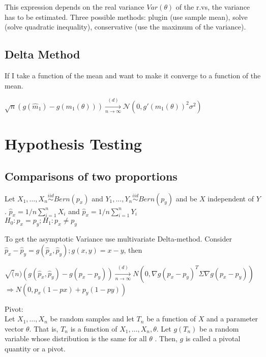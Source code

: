 This expression depends on the real variance $Var(\theta)$ of the r.vs, the variance has to be estimated. Three possible methods: plugin (use sample mean), solve (solve quadratic inequality), conservative (use the maximum of the variance).\\

\subsection*{Delta Method}

If I take a function of the mean and want to make it converge to a function of the mean. 

$\sqrt{n}(g(\widehat{m}_1) - g(m_1(\theta ))) \xrightarrow [n \to \infty ]{(d)} \mathcal{N}(0, g'(m_1(\theta ))^2 \sigma ^2)$


\section{Hypothesis Testing}
\subsection*{Comparisons of two proportions}

Let $X_1,\dots ,X_ n \stackrel{iid}{\sim} Bern(p_x)$ and  $Y_1,\dots ,Y_ n \stackrel{iid}{\sim} Bern(p_y)$ and be $X$ independent of $Y$. $\hat{p}_x= 1/n \sum_{i=1}^{n} X_i$ and $\hat{p}_x= 1/n \sum_{i=1}^{n} Y_i$\\

$H_0: p_x = p_y; H_1: p_x \neq p_y$

To get the asymptotic Variance use multivariate Delta-method. Consider $\hat{p}_x - \hat{p}_y = g(\hat{p}_x,\hat{p}_y); g(x,y)= x -y$, then

$\sqrt(n) (g(\hat{p}_x,\hat{p}_y) - g(p_x-p_y)) \xrightarrow[n \rightarrow \infty]{(d)} N(0,\nabla g(p_x-p_y)^T \Sigma \nabla g(p_x-p_y))$\\ 

$\Rightarrow N(0,p_x(1-px) + p_y(1-py))$

Pivot:\\

Let $X_1,\dots ,X_ n$ be random samples and let $T_ n$  be a function of $X$ and a parameter vector $\theta$. That is, $T_n$ is a function of $X_1,\dots ,X_ n,\theta$. Let $g(T_ n)$ be a random variable whose distribution is the same for all $\theta$ . Then, $g$ is called a pivotal quantity or a pivot.\\

